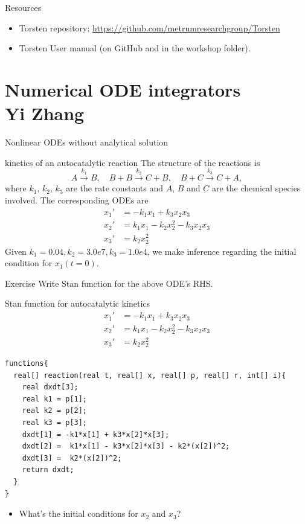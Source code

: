 \documentclass[presentation]{beamer}
\begin{document}
\begin{frame}[label={sec:org826c671}]{Resources}
\begin{itemize}
\item Torsten repository: \url{https://github.com/metrumresearchgroup/Torsten}
\item Torsten User manual (on GitHub and in the workshop folder).
\end{itemize}
\end{frame}

\section{Numerical ODE integrators \\ \footnotesize{Yi Zhang}}
\label{sec:org5b16eb5}

\begin{frame}[label={sec:orga78120b}]{Nonlinear ODEs without analytical solution}
\begin{block}{kinetics of an autocatalytic reaction \cite{robertson_numerical_1966}}
The structure of the reactions is 
\begin{equation*}
A \xrightarrow{k_1} B,\quad
B+B \xrightarrow{k_2} C + B,\quad
B+C \xrightarrow{k_3} C + A,
\end{equation*}
where \(k_1\), \(k_2\), \(k_3\) are the rate
constants and \(A\), \(B\) and \(C\) are the chemical species
involved. The corresponding ODEs are
\begin{align*}
x_1' &= -k_1x_1 + k_3x_2x_3\\
x_2' &=  k_1x_1 - k_2x_2^2 - k_3x_2x_3\\
x_3' &=  k_2x_2^2
\end{align*}
Given \(k_1=0.04, k_2=3.0e7, k_3=1.0e4\), we make inference
regarding the initial condition for \(x_1(t=0)\).
\end{block}
\begin{block}{Exercise}
Write Stan function for the above ODE's RHS.
\end{block}
\end{frame}

\begin{frame}[fragile,label={sec:orgc560291}]{Stan function for autocatalytic kinetics}
 \begin{align*}
x_1' &= -k_1x_1 + k_3x_2x_3\\
x_2' &=  k_1x_1 - k_2x_2^2 - k_3x_2x_3\\
x_3' &=  k_2x_2^2
\end{align*}

\begin{verbatim}
functions{
  real[] reaction(real t, real[] x, real[] p, real[] r, int[] i){
    real dxdt[3];
    real k1 = p[1];
    real k2 = p[2];
    real k3 = p[3];
    dxdt[1] = -k1*x[1] + k3*x[2]*x[3];
    dxdt[2] =  k1*x[1] - k3*x[2]*x[3] - k2*(x[2])^2;
    dxdt[3] =  k2*(x[2])^2;
    return dxdt;
  }
}
\end{verbatim}
\begin{itemize}
\item What's the initial conditions for \(x_2\) and \(x_3\)?
\end{itemize}
\end{frame}
\end{document}
